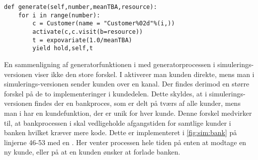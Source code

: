 \begin{lstlisting}[firstnumber=11, label=fig:simpy:generator, caption=Generator funktion for \simpy]
def generate(self,number,meanTBA,resource):         
    for i in range(number):
        c = Customer(name = "Customer%02d"%(i,))
        activate(c,c.visit(b=resource))              
        t = expovariate(1.0/meanTBA)               
        yield hold,self,t
\end{lstlisting}

En sammenligning af generatorfunktionen i \simpy med generatorprocessen i simulerings-versionen viser ikke den store forskel. I \simpy aktiverer man kunden direkte, mens man i simulerings-versionen sender kunden over en kanal. Der findes derimod en større forskel på de to implementeringer i kundedelen. Dette skyldes, at i simulerings-versionen findes der en bankproces, som er delt på tværs af alle kunder, mens man i \simpy har en kundefunktion, der er unik for hver kunde. Denne forskel medvirker til, at bankprocessen i \simpy skal vedligeholde afgangstiden for samtlige kunder i banken  hvilket kræver mere kode. Dette er implementeret i  \cref{fig:sim:bank} på linjerne 46-53 med en . Her venter processen hele tiden på enten at modtage en ny kunde, eller på at en kunden ønsker at forlade banken.

